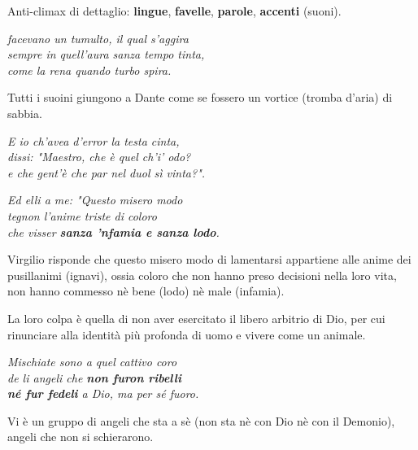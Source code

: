 \documentclass[a4paper]{article}
\begin{document}
Anti-climax di dettaglio: \textbf{lingue}, \textbf{favelle}, \textbf{parole}, \textbf{accenti} (suoni).

\begin{center}
    \textit{facevano un tumulto, il qual s'aggira} \\
    \textit{sempre in quell'aura sanza tempo tinta,} \\
    \textit{come la rena quando turbo spira.}
\end{center}

Tutti i suoini giungono a Dante come se fossero un vortice (tromba d'aria) di sabbia.

\begin{center}
    \textit{E io ch'avea d'error la testa cinta,} \\
    \textit{dissi: "Maestro, che è quel ch'i' odo?} \\
    \textit{e che gent'è che par nel duol sì vinta?". }
\end{center}

\begin{center}
    \textit{Ed elli a me: "Questo misero modo} \\
    \textit{tegnon l'anime triste di coloro} \\
    \textit{che visser \textbf{sanza 'nfamia e sanza lodo}. }
\end{center}


Virgilio risponde che questo misero modo di lamentarsi appartiene
alle anime dei pusillanimi (ignavi), ossia coloro che non hanno preso decisioni
nella loro vita, non hanno commesso nè bene (lodo) nè male (infamia).

La loro colpa è quella di non aver esercitato il libero arbitrio di Dio,
per cui rinunciare alla identità più profonda di uomo e vivere come un animale.

\begin{center}
    \textit{Mischiate sono a quel cattivo coro} \\
    \textit{de li angeli che \textbf{non furon ribelli}} \\
    \textit{\textbf{né fur fedeli} a Dio, ma per sé fuoro.}
\end{center}

Vi è un gruppo di angeli che sta a sè (non sta nè con Dio nè con il Demonio), angeli che non si schierarono.
\end{document}
